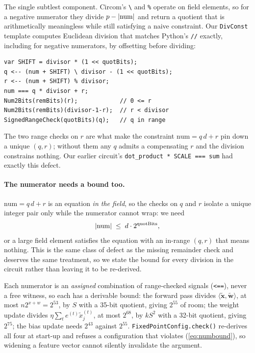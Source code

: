 \documentclass{llncs}
\begin{document}
The single subtlest component. Circom's \verb|\| and \verb|%| operate on field
elements, so for a negative numerator they divide $p - |{\rm num}|$ and return a
quotient that is arithmetically meaningless while still satisfying a naive
constraint. Our \texttt{DivConst} template computes Euclidean division that
matches Python's \verb|//| exactly, including for negative numerators, by
offsetting before dividing:

\begin{lstlisting}
var SHIFT = divisor * (1 << quotBits);
q <-- (num + SHIFT) \ divisor - (1 << quotBits);
r <-- (num + SHIFT) % divisor;
num === q * divisor + r;
Num2Bits(remBits)(r);            // 0 <= r
Num2Bits(remBits)(divisor-1-r);  // r < divisor
SignedRangeCheck(quotBits)(q);   // q in range
\end{lstlisting}

The two range checks on $r$ are what make the constraint
$\mathrm{num} = q\,d + r$ pin down a unique $(q, r)$; without them any $q$ admits
a compensating $r$ and the division constrains nothing. Our earlier circuit's
\verb|dot_product * SCALE === sum| had exactly this defect.

\paragraph{The numerator needs a bound too.}
$\mathrm{num} = q\,d + r$ is an equation \emph{in the field}, so the checks on
$q$ and $r$ isolate a unique integer pair only while the numerator cannot wrap:
we need
\begin{equation}
  |\mathrm{num}| \;\le\; d \cdot 2^{\rm quotBits} ,
  \label{eq:numbound}
\end{equation}
or a large field element satisfies the equation with an in-range $(q, r)$ that
means nothing. This is the same class of defect as the missing remainder check
and deserves the same treatment, so we state the bound for every division in the
circuit rather than leaving it to be re-derived.

Each numerator is an \emph{assigned} combination of range-checked signals
(\texttt{<==}), never a free witness, so each has a derivable bound: the forward
pass divides $\langle \tilde{\mathbf{x}}, \tilde{\mathbf{w}}\rangle$, at most
$n 2^{x+w} = 2^{53}$, by $S$ with a 35-bit quotient, giving $2^{55}$ of room;
the weight update divides $\eta \sum_t e^{(t)} \tilde x^{(t)}_j$, at most
$2^{68}$, by $kS^2$ with a 32-bit quotient, giving $2^{75}$; the bias update
needs $2^{43}$ against $2^{55}$. \texttt{FixedPointConfig.check()} re-derives
all four at start-up and refuses a configuration that violates
(\ref{eq:numbound}), so widening a feature vector cannot silently invalidate the
argument.
\end{document}
